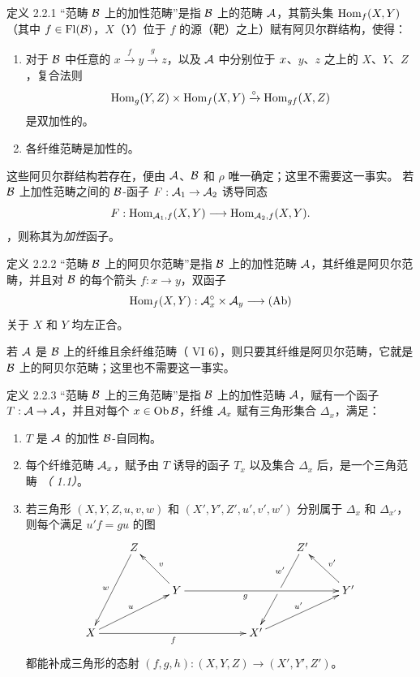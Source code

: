 \begin{enonce*}{定义 2.2.1}
“范畴 $\Bb$ 上的加性范畴”是指 $\Bb$ 上的范畴 $\Aa$，其箭头集 $\Hom_f(X,Y)$（其中 $f\in \Fl (\Bb)$，$X$（\resp $Y$）位于 $f$ 的源（\resp 靶）之上）赋有阿贝尔群结构，使得：
\begin{enumerate}
\renewcommand{\theenumi}{\roman{enumi}}
\renewcommand{\labelenumi}{(\theenumi)}
\item 对于 $\Bb$ 中任意的 $x\xrightarrow{f}y\xrightarrow{g}z$，以及 $\Aa$ 中分别位于 $\sisi{s}{x}$、$y$、$z$ 之上的 $X$、$Y$、$Z$，复合法则
\[
\Hom_g(Y,Z)\times \Hom_f
(X,Y)\xrightarrow{\circ}\Hom_{gf}(X,Z)
\]
是双加性的。

\item 各纤维范畴是加性的。
\end{enumerate}
\end{enonce*}

这些阿贝尔群结构若存在，便由 $\Aa$、$\Bb$ 和 $\rho$ 唯一确定；这里不需要这一事实。 若 $\Bb$ 上加性范畴之间的 $\Bb$-函子 $F:\Aa_1\rightarrow \Aa_2$ 诱导同态
\[
F:\Hom_{\Aa_1,f}(X,Y)\longrightarrow
\Hom_{\Aa_{2},f}(X,Y){\quoi}.
\]
，则称其为\emph{加性}函子。

\begin{enonce*}{定义 2.2.2}
“范畴 $\Bb$ 上的阿贝尔范畴”\pageoriginale 是指 $\Bb$ 上的加性范畴 $\Aa$，其纤维是阿贝尔范畴，并且对 $\Bb$ 的每个箭头 $f:x\rightarrow y$，双函子
\[
\Hom_f(X,Y):\Aa^{\circ}_x\times \Aa_y\longrightarrow
(\Ab)
\]
关于 $X$ 和 $Y$ 均左正合。
\end{enonce*}

若 $\Aa$ 是 $\Bb$ 上的纤维且余纤维范畴（ VI 6），则只要其纤维是阿贝尔范畴，它就是 $\Bb$ 上的阿贝尔范畴；这里也不需要这一事实。

\begin{enonce*}{定义 2.2.3}
“范畴 $\Bb$ 上的三角范畴”是指 $\Bb$ 上的加性范畴 $\Aa$，赋有一个函子 $T:\Aa\rightarrow \Aa$，并且对每个 $x\in \Ob \Bb$，纤维 $\Aa_x$ 赋有三角形集合 $\Delta_x$，满足：
\begin{enumerate}
\renewcommand{\theenumi}{\roman{enumi}}
\renewcommand{\labelenumi}{(\theenumi)}
\item $T$ 是 $\Aa$ 的加性 $\Bb$-自同构。

\item 每个纤维范畴 $\Aa_x$，赋予由 $T$ 诱导的函子 $T_x$ 以及集合 $\Delta_x$ 后，是一个三角范畴 \emph{（\cite{sga4.exp.XVII.bib.CD} 1.1）}。

\item 若三角形 $(X,Y,Z,u,v,w)$ 和 $(X',Y',Z',u',v',w')$ 分别属于 $\Delta_x$ 和 $\Delta_{x'}$，则每个满足 $u'f=gu$ 的图
\[
\xymatrix{
            & Z   \ar[ldd]_{w}&            &  &           & Z'   \ar[ldd]|\hole_(.3){w'} & \\
            &   & Y\ar[lu]_{v} \ar[rrrr]_(.4){\sisi{j}{g}}&  &     &       &Y'\ar[lu]_{v'} \\
X   \ar[rru]^{u} \ar[rrrr]_{f}&             &          &  &   X'   \ar[rru]^{u'} &              &
}
\]
都能补成三角形的态射 $(f,g,h):(X,Y,Z)\rightarrow (X',Y',Z')$。
\end{enumerate}
\end{enonce*}

